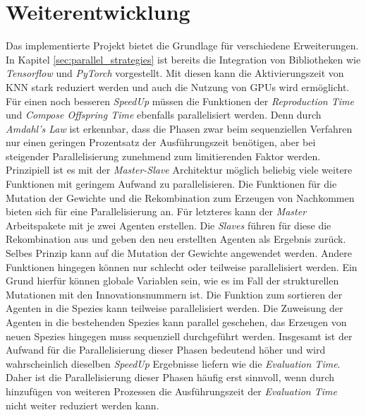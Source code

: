 \section{Weiterentwicklung}
Das implementierte Projekt bietet die Grundlage für verschiedene Erweiterungen. In Kapitel \ref{sec:parallel_strategies} ist bereits die Integration von Bibliotheken wie \emph{Tensorflow} und \emph{PyTorch} vorgestellt. Mit diesen kann die Aktivierungszeit von \ac{KNN} stark reduziert werden und auch die Nutzung von \acp{GPU} wird ermöglicht. Für einen noch besseren \emph{SpeedUp} müssen die Funktionen der \emph{Reproduction Time} und \emph{Compose Offspring Time} ebenfalls parallelisiert werden. Denn durch \emph{Amdahl's Law} ist erkennbar, dass die Phasen zwar beim sequenziellen Verfahren nur einen geringen Prozentsatz der Ausführungszeit benötigen, aber bei steigender Parallelisierung zunehmend zum limitierenden Faktor werden. Prinzipiell ist es mit der \emph{Master-Slave} Architektur möglich beliebig viele weitere Funktionen mit geringem Aufwand zu parallelisieren. 
Die Funktionen für die Mutation der Gewichte und die Rekombination zum Erzeugen von Nachkommen bieten sich für eine Parallelisierung an. Für letzteres kann der \emph{Master} Arbeitspakete mit je zwei Agenten erstellen. Die \emph{Slaves} führen für diese die Rekombination aus und geben den neu erstellten Agenten als Ergebnis zurück. Selbes Prinzip kann auf die Mutation der Gewichte angewendet werden. Andere Funktionen hingegen können nur schlecht oder teilweise parallelisiert werden. Ein Grund hierfür können globale Variablen sein, wie es im Fall der strukturellen Mutationen mit den Innovationsnummern ist. Die Funktion zum sortieren der Agenten in die Spezies kann teilweise parallelisiert werden. Die Zuweisung der Agenten in die bestehenden Spezies kann parallel geschehen, das Erzeugen von neuen Spezies hingegen muss sequenziell durchgeführt werden. Insgesamt ist der Aufwand für die Parallelisierung dieser Phasen bedeutend höher und wird wahrscheinlich dieselben \emph{SpeedUp} Ergebnisse liefern wie die \emph{Evaluation Time}. Daher ist die Parallelisierung dieser Phasen häufig erst sinnvoll, wenn durch hinzufügen von weiteren Prozessen die Ausführungszeit der \emph{Evaluation Time} nicht weiter reduziert werden kann. 


